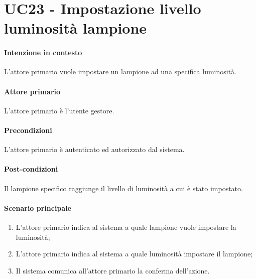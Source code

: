 \section{UC23 - Impostazione livello luminosità lampione}\label{uc:23}
\paragraph{Intenzione in contesto} L'attore primario vuole impostare un lampione ad una specifica luminosità.

\paragraph{Attore primario} L'attore primario è l'utente gestore.

\paragraph{Precondizioni}  L'attore primario è autenticato ed autorizzato dal sistema.

\paragraph{Post-condizioni} Il lampione specifico raggiunge il livello di luminosità a cui è stato impostato.
\paragraph{Scenario principale}
\begin{enumerate}
    \item L'attore primario indica al sistema a quale lampione vuole impostare la luminosità;
    \item L'attore primario indica al sistema a quale luminosità impostare il lampione;
    \item Il sistema comunica all'attore primario la conferma dell'azione.
\end{enumerate}